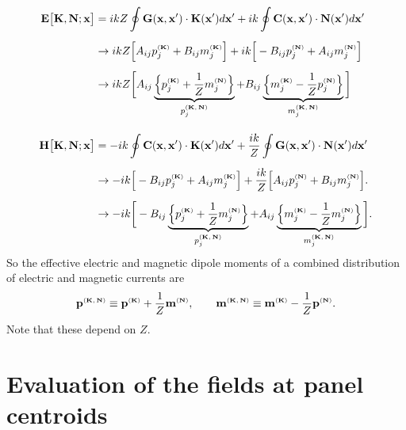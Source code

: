 \documentclass[letterpaper]{article}
\begin{document}
\begin{align*}
 \mathbf{E}\big[\mathbf{K}, \mathbf{N}; \mathbf{x}\big]
 &=  ikZ \oint \mathbf{G}(\mathbf{x}, \mathbf{x}^\prime) \cdot \mathbf{K}(\mathbf{x}^\prime) d\mathbf{x}^\prime
     + ik\oint \mathbf{C}(\mathbf{x}, \mathbf{x}^\prime) \cdot \mathbf{N}(\mathbf{x}^\prime) d\mathbf{x}^\prime
\\[5pt]
 &\to ikZ \Big[   A_{ij} p_j^{\text{\tiny{($\mathbf{K}$)}}} + B_{ij} m_j^{\text{\tiny{($\mathbf{K}$)}}} \Big] 
       +ik\Big[  -B_{ij} p_j^{\text{\tiny{($\mathbf{N}$)}}} + A_{ij} m_j^{\text{\tiny{($\mathbf{N}$)}}} \Big]
\\[5pt]
 &\to ikZ \bigg[   A_{ij} 
                  \underbrace{\Big\{ p_j^{\text{\tiny{($\mathbf{K}$)}}} + \frac{1}{Z}m_j^{\text{\tiny{($\mathbf{N}$)}}} \Big\}}
                             _{p_j^{\text{\tiny{($\mathbf{K,N}$)}}}}
                  +B_{ij} 
                  \underbrace{\Big\{ m_j^{\text{\tiny{($\mathbf{K}$)}}} - \frac{1}{Z}p_j^{\text{\tiny{($\mathbf{N}$)}}} \Big\}}
                             _{m_j^{\text{\tiny{($\mathbf{K,N}$)}}}}
          \bigg]
\\[10pt]
 \mathbf{H}\big[\mathbf{K}, \mathbf{N}; \mathbf{x}\big]
 &=  -ik\oint \mathbf{C}(\mathbf{x}, \mathbf{x}^\prime) \cdot \mathbf{K}(\mathbf{x}^\prime) d\mathbf{x}^\prime
   +\frac{ik}{Z} \oint \mathbf{G}(\mathbf{x}, \mathbf{x}^\prime) \cdot \mathbf{N}(\mathbf{x}^\prime) d\mathbf{x}^\prime
\\[5pt]
 &\to       -ik\Big[  -B_{ij} p_j^{\text{\tiny{($\mathbf{K}$)}}} + A_{ij} m_j^{\text{\tiny{($\mathbf{K}$)}}} \Big]
  +\frac{ik}{Z}\Big[   A_{ij} p_j^{\text{\tiny{($\mathbf{N}$)}}} + B_{ij} m_j^{\text{\tiny{($\mathbf{N}$)}}} \Big].
\\[5pt]
 &\to      -ik\bigg[  -B_{ij} 
                      \underbrace{\Big\{p_j^{\text{\tiny{($\mathbf{K}$)}}} + \frac{1}{Z}m_j^{\text{\tiny{($\mathbf{N}$)}}}\Big\}}
                                _{p_j^{\text{\tiny{($\mathbf{K,N}$)}}}}
                      +A_{ij} 
                      \underbrace{\Big\{m_j^{\text{\tiny{($\mathbf{K}$)}}} - \frac{1}{Z}m_j^{\text{\tiny{($\mathbf{N}$)}}}\Big\}}
                                _{m_j^{\text{\tiny{($\mathbf{K,N}$)}}}}
              \bigg].
\end{align*}
So the effective electric and magnetic dipole moments of a combined
distribution of electric and magnetic currents are 
$$ \mathbf{p}^{\text{\tiny{($\mathbf{K,N}$)}}} \equiv \mathbf{p}^{\text{\tiny{($\mathbf{K}$)}}} + \frac{1}{Z}\mathbf{m}^{\text{\tiny{($\mathbf{N}$)}}},
   \qquad
   \mathbf{m}^{\text{\tiny{($\mathbf{K,N}$)}}} \equiv \mathbf{m}^{\text{\tiny{($\mathbf{K}$)}}} - \frac{1}{Z}\mathbf{p}^{\text{\tiny{($\mathbf{N}$)}}}.
$$
Note that these depend on $Z$.

\newpage
\section{Evaluation of the fields at panel centroids}
\end{document}
